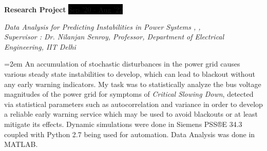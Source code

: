 \documentclass[paper=a4,fontsize=11pt]{scrartcl} %
\newcommand{\sepspace}{\vspace*{1em}}		%
\newcommand{\NewPart}[1]{\section*{\uppercase{#1}}}
\newcommand{\EducationEntry}[4]{
		\noindent \textbf{#1} \hfill      %
		\colorbox{Black}{%
			\parbox{10em}{%
			\hfill\color{White}#2}} \par  %
		\noindent \textit{#3} \par        %
		\noindent\hangindent=2em\hangafter=0 \small #4 %
		\normalsize \par}
\newcommand{\WorkEntry}[4]{				  %
		\noindent \textbf{#1} \hfill      %
		\colorbox{Black}{\color{White}#2} \par  %
		\noindent \textit{#3} \par              %
		\noindent\hangindent=2em\hangafter=0 \small #4 %
		\normalsize \par}
\begin{document}
\sepspace

\WorkEntry{Research Project}{Sep '20 - Aug '22}{Data Analysis for Predicting Instabilities in Power Systems \href{https://github.com/Realife-Brahmin/eld895_simulation_psse}{\textcolor{pythonblue}{\faGithub}}, \href{https://github.com/Realife-Brahmin/eld895_analysis_simulated_grids}{\textcolor{matlaborange}{\faGithub}}, \href{https://github.com/Realife-Brahmin/eld895_analysis_real_grids}{\textcolor{matlaborange}{\faGithub}}\\ Supervisor : Dr. Nilanjan Senroy, Professor, Department of Electrical Engineering, IIT Delhi}{An accumulation of stochastic disturbances in the power grid causes various steady state instabilities to develop, which can lead to blackout without any early warning indicators. My task was to statistically analyze the bus voltage magnitudes of the power grid for symptoms of \textit{Critical Slowing Down}, detected via statistical parameters such as autocorrelation and variance in order to develop a reliable early warning service which may be used to avoid blackouts or at least mitigate its effects. Dynamic simulations were done in Siemens PSS®E 34.3 coupled with Python 2.7 being used for automation. Data Analysis was done in MATLAB.}




\end{document}
